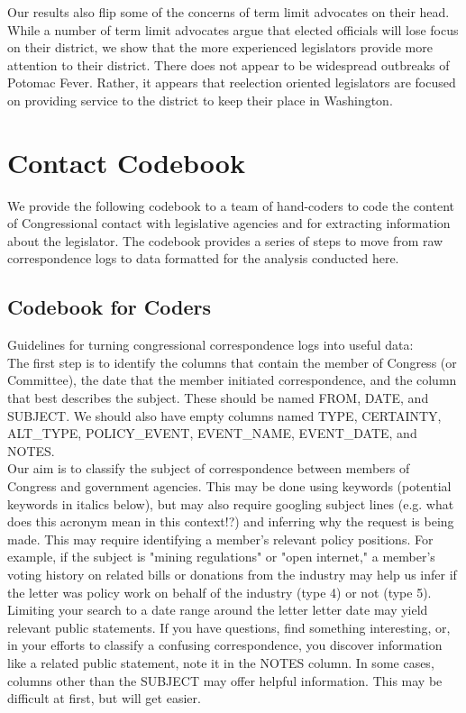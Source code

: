 \documentclass{article}
\begin{document}
Our results also flip some of the concerns of term limit advocates on their head.  While a number of term limit advocates argue that elected officials will lose focus on their district, we show that the more experienced legislators provide more attention to their district.  There does not appear to be widespread outbreaks of Potomac Fever.  Rather, it appears that reelection oriented legislators are focused on providing service to the district to keep their place in Washington.   





\appendix





\section{Contact Codebook} \label{a:codebook}
We provide the following codebook to a team of hand-coders to code the content of Congressional contact with legislative agencies and for extracting information about the legislator. The codebook provides a series of steps to move from raw correspondence logs to data formatted for the analysis conducted here.  



\subsection{Codebook for Coders}
Guidelines for turning congressional correspondence logs into useful data:\\

The first step is to identify the columns that contain the member of Congress (or Committee), the date that the member initiated correspondence, and the column that best describes the subject. These should be named FROM, DATE, and SUBJECT. We should also have empty columns named TYPE, CERTAINTY, ALT\_TYPE, POLICY\_EVENT, EVENT\_NAME, EVENT\_DATE, and NOTES.  \\

Our aim is to classify the subject of correspondence between members of Congress and government agencies. This may be done using keywords (potential keywords in italics below), but may also require googling subject lines (e.g. what does this acronym mean in this context!?) and inferring why the request is being made. This may require identifying a member's relevant policy positions. For example, if the subject is "mining regulations" or "open internet," a member's voting history on related bills or donations from the industry may help us infer if the letter was policy work on behalf of the industry (type 4) or not (type 5). Limiting your search to a date range around the letter letter date may yield relevant public statements. If you have questions, find something interesting, or, in your efforts to classify a confusing correspondence, you discover information like a related public statement, note it in the NOTES column. In some cases, columns other than the SUBJECT may offer helpful information. This may be difficult at first, but will get easier. \\
\end{document}

